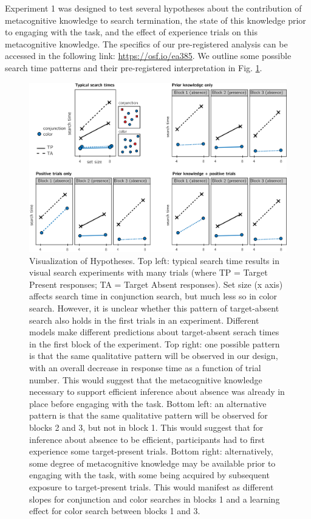 \documentclass[12pt,twoside]{reedthesis}
\begin{document}
Experiment 1 was designed to test several hypotheses about the contribution of metacognitive knowledge to search termination, the state of this knowledge prior to engaging with the task, and the effect of experience trials on this metacognitive knowledge. The specifics of our pre-registered analysis can be accessed in the following link: \url{https://osf.io/ea385}. We outline some possible search time patterns and their pre-registered interpretation in Fig. \ref{fig:ch1-models}.
\begin{figure}
\includegraphics[width=\textwidth]{figure/ch1/models} \caption{Visualization of Hypotheses. Top left: typical search time results in visual search experiments with many trials (where TP =  Target Present responses; TA = Target Absent responses). Set size (x axis) affects search time in conjunction search, but much less so in color search. However, it is unclear whether this pattern of target-absent search also holds in the first trials in an experiment. Different models make different predictions about target-absent serach times in the first block of the experiment. Top right: one possible pattern is that the same qualitative pattern will be observed in our design, with an overall decrease in response time as a function of trial number. This would suggest that the metacognitive knowledge necessary to support efficient inference about absence was already in place before engaging with the task. Bottom left: an alternative pattern is that the same qualitative pattern will be observed for blocks 2 and 3, but not in block 1. This would suggest that for inference about absence to be efficient, participants had to first experience some target-present trials. Bottom right: alternatively, some degree of metacognitive knowledge may be available prior to engaging with the task, with some being acquired by subsequent exposure to target-present trials. This would manifest as different slopes for conjunction and color searches in blocks 1 and a learning effect for color search between blocks 1 and 3.}\label{fig:ch1-models}
\end{figure}
\end{document}
